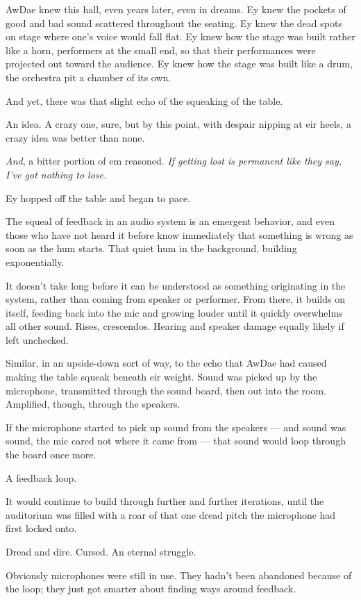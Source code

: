 AwDae knew this hall, even years later, even in dreams. Ey knew the pockets of good and bad sound scattered throughout the seating. Ey knew the dead spots on stage where one's voice would fall flat. Ey knew how the stage was built rather like a horn, performers at the small end, so that their performances were projected out toward the audience. Ey knew how the stage was built like a drum, the orchestra pit a chamber of its own.

And yet, there was that slight echo of the squeaking of the table.

An idea. A crazy one, sure, but by this point, with despair nipping at eir heels, a crazy idea was better than none.

\emph{And}, a bitter portion of em reasoned. \emph{If getting lost is permanent like they say, I've got nothing to lose.}

Ey hopped off the table and began to pace.

The squeal of feedback in an audio system is an emergent behavior, and even those who have not heard it before know immediately that something is wrong as soon as the hum starts. That quiet hum in the background, building exponentially.

It doesn't take long before it can be understood as something originating in the system, rather than coming from speaker or performer. From there, it builds on itself, feeding back into the mic and growing louder until it quickly overwhelms all other sound. Rises, crescendos. Hearing and speaker damage equally likely if left unchecked.

Similar, in an upside-down sort of way, to the echo that AwDae had caused making the table squeak beneath eir weight. Sound was picked up by the microphone, transmitted through the sound board, then out into the room. Amplified, though, through the speakers.

If the microphone started to pick up sound from the speakers — and sound was sound, the mic cared not where it came from — that sound would loop through the board once more.

A feedback loop.

It would continue to build through further and further iterations, until the auditorium was filled with a roar of that one dread pitch the microphone had first locked onto.

Dread and dire. Cursed. An eternal struggle.

Obviously microphones were still in use. They hadn't been abandoned because of the loop; they just got smarter about finding ways around feedback.


